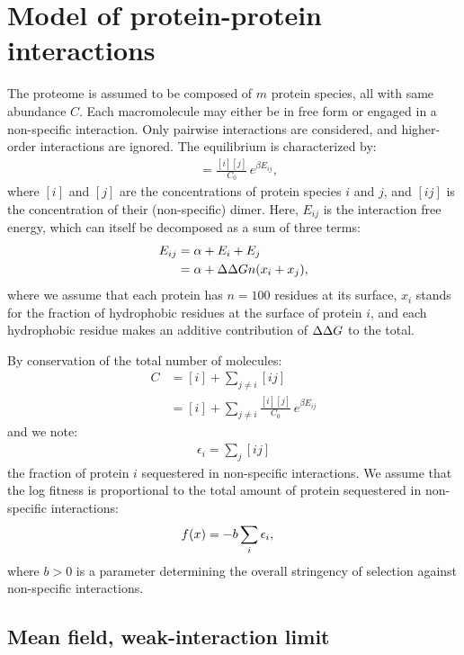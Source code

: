 \section{Model of protein-protein interactions}
\label{sec:model-of-protein-protein-interactions}

The proteome is assumed to be composed of $m$ protein species, all with same abundance $C$.
Each macromolecule may either be in free form or engaged in a non-specific interaction.
Only pairwise interactions are considered, and higher-order interactions are ignored.
The equilibrium is characterized by:
\begin{align}
[ij]
    & = \frac{[i][j]}{C_0} \, e^{\beta E_{ij}},
\end{align}
where $[i]$ and $[j]$ are the concentrations of protein species $i$ and $j$, and $[ij]$ is the concentration of their (non-specific) dimer. Here, $E_{ij}$ is the interaction free energy, which can itself be decomposed as a sum of three terms:
\begin{align}
    E_{ij} & = \alpha + E_i + E_j
    \\
    & = \alpha + \Delta \Delta G n (x_i + x_j),
\end{align}
where we assume that each protein has $n=100$ residues at its surface, $x_i$ stands for the fraction of hydrophobic residues at the surface of protein $i$, and each hydrophobic residue makes an additive contribution of $\Delta \Delta G$ to the total.

By conservation of the total number of molecules:
\begin{align}
    C & = [i] + \sum\limits_{j \neq i} [ij] \\
    & = [i] + \sum\limits_{j \neq i} \frac{[i][j]}{C_0} \, e^{\beta E_{ij}}
\end{align}
and we note:
\begin{align}
    \epsilon_i = \sum_j [ij]
\end{align}
the fraction of protein $i$ sequestered in non-specific interactions.
We assume that the log fitness is proportional to the total amount of protein sequestered in non-specific interactions:
\begin{align}
    f (x) & = -b \sum_i \epsilon_i,
\end{align}
where $b>0$ is a parameter determining the overall stringency of selection against non-specific interactions.

\subsection{Mean field, weak-interaction limit}
\label{subsec:mean-field-interaction-limit}

